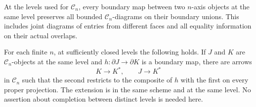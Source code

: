 \begin{lemma}
\label{iter:boundary-diagrams}
At the levels used for $\mathcal C_n$, every boundary map
between two $n$-axis objects at the same level preserves all
bounded $\mathcal C_n$-diagrams on their boundary unions.
This includes joint diagrams of entries from different faces
and all equality information on their actual overlaps.
\end{lemma}

\begin{theorem}
\label{iter:boundary-completion}
For each finite $n$, at sufficiently closed levels the following
holds. If $J$ and $K$ are $\mathcal C_n$-objects at the same
level and $h:\partial J\to\partial K$ is a boundary map,
there are arrows
\[
 K\longrightarrow K^*,\qquad J\longrightarrow K^*
\]
in $\mathcal C_n$ such that the second restricts to the
composite of $h$ with the first on every proper projection.
The extension is in the same scheme and at the same level.
No assertion about completion between distinct levels is
needed here.
\end{theorem}

